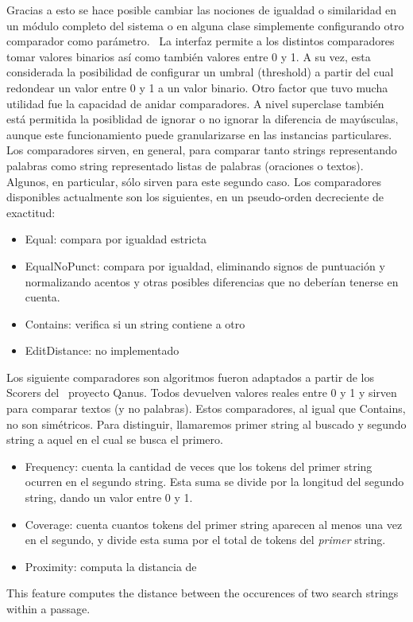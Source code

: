Gracias a esto se hace posible cambiar las nociones de igualdad o
similaridad en un módulo completo del sistema o en alguna clase
simplemente configurando otro comparador como parámetro. \ La
interfaz permite a los distintos comparadores tomar valores binarios
así como también valores entre 0 y 1. A su vez, esta considerada la
posibilidad de configurar un umbral (threshold) a partir del cual
redondear un valor entre 0 y 1 a un valor binario. Otro factor que tuvo
mucha utilidad fue la capacidad de anidar comparadores. A nivel
superclase también está permitida la posiblidad de ignorar o no
ignorar la diferencia de mayúsculas, aunque este funcionamiento puede
granularizarse en las instancias particulares. Los comparadores sirven,
en general, para comparar tanto strings representando palabras como
string representado listas de palabras (oraciones o textos). Algunos,
en particular, sólo sirven para este segundo caso. Los comparadores
disponibles actualmente son los siguientes, en un pseudo-orden
decreciente de exactitud:


\begin{itemize}
\item Equal: compara por igualdad estricta
\item EqualNoPunct: compara por igualdad, eliminando signos de
puntuación y normalizando acentos y otras posibles diferencias que no
deberían tenerse en cuenta.
\item Contains: verifica si un string contiene a otro
\item EditDistance: no implementado
\end{itemize}
Los siguiente comparadores son algoritmos fueron adaptados a partir de
los Scorers del \ proyecto Qanus. Todos devuelven valores reales entre
0 y 1 y sirven para comparar textos (y no palabras). Estos
comparadores, al igual que Contains, no son simétricos. Para
distinguir, llamaremos primer string al buscado y segundo string a
aquel en el cual se busca el primero. 


\begin{itemize}
\item Frequency: cuenta la cantidad de veces que los tokens del primer
string ocurren en el segundo string. Esta suma se divide por la
longitud del segundo string, dando un valor entre 0 y 1.
\item Coverage: cuenta cuantos tokens del primer string aparecen al
menos una vez en el segundo, y divide esta suma por el total de tokens
del \textit{primer} string.
\item Proximity: computa la distancia de 
\end{itemize}
This feature computes the distance between the occurences of two search
strings within a passage.

